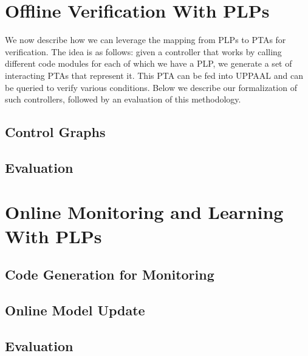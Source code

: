 \documentclass[ 5p, 12pt, times, twocolumn, sort&compress ]{elsarticle}
\begin{document}

\section{Offline Verification With PLPs}
We now describe how we can leverage the mapping from PLPs to PTAs for verification. The idea is as follows: given a controller that works by calling different code modules for each of which we have a PLP, we generate a set of interacting PTAs that represent it. This PTA can be fed into UPPAAL and can be queried to verify various conditions. Below we describe our formalization of such controllers, followed by an evaluation of this methodology.

\subsection{Control Graphs}

\subsection{Evaluation}

\section{Online Monitoring and Learning With PLPs}

\subsection{Code Generation for Monitoring}

\subsection{Online Model Update}

\subsection{Evaluation}
\end{document}
